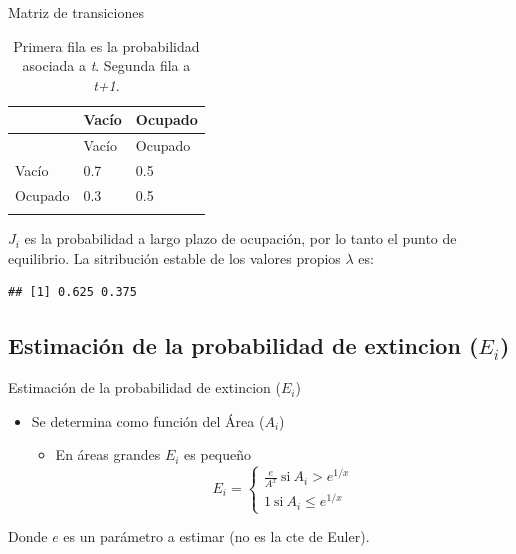 \documentclass[
  11pt,
  ignorenonframetext,
]{beamer}
\providecommand{\tightlist}{%
  \setlength{\itemsep}{0pt}\setlength{\parskip}{0pt}}
\begin{document}
\begin{frame}[fragile]{Matriz de transiciones}
\begin{longtable}[]{@{}lll@{}}
\caption{Primera fila es la probabilidad asociada a \emph{t}. Segunda
fila a \emph{t+1}.}\tabularnewline
\toprule\noalign{}
& Vacío & Ocupado \\
\midrule\noalign{}
\endfirsthead
\toprule\noalign{}
& Vacío & Ocupado \\
\midrule\noalign{}
\endhead
Vacío & 0.7 & 0.5 \\
Ocupado & 0.3 & 0.5 \\
\bottomrule\noalign{}
\end{longtable}

\(J_i\) es la probabilidad a largo plazo de ocupación, por lo tanto el
punto de equilibrio. La sitribución estable de los valores propios
\(\lambda\) es:

\begin{verbatim}
## [1] 0.625 0.375
\end{verbatim}
\end{frame}

\hypertarget{estimaciuxf3n-de-la-probabilidad-de-extincion-e_i}{%
\subsection{\texorpdfstring{Estimación de la probabilidad de extincion
(\(E_i\))}{Estimación de la probabilidad de extincion (E\_i)}}\label{estimaciuxf3n-de-la-probabilidad-de-extincion-e_i}}

\begin{frame}{Estimación de la probabilidad de extincion (\(E_i\))}
\begin{itemize}
\item
  Se determina como función del Área (\(A_i\))

  \begin{itemize}
  \tightlist
  \item
    En áreas grandes \(E_i\) es pequeño \begin{equation}
    E_i = \left\{ \begin{aligned}
    \frac{e}{A^x} \mathrm{\ si\ } A_i > e^{1/x}\\
    1 \mathrm{\ si\ } A_i \leq e^{1/x}
    \end{aligned} \right.
    \end{equation}
  \end{itemize}
\end{itemize}

Donde \(e\) es un parámetro a estimar (no es la cte de Euler).
\end{frame}
\end{document}
